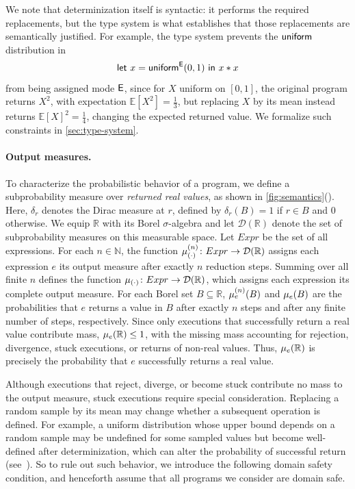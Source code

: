 We note that determinization itself is syntactic: it performs the required replacements, but the type system is what establishes that those replacements are semantically justified. For example, the type system prevents the $\mathsf{uniform}$ distribution in
\[
  \kw{let}\ x=\kw{uniform}^{\E}(0,1)\ \kw{in}\ x*x
\]
from being assigned mode $\mathsf{E}$, since for $X$ uniform on $[0,1]$, the original program returns $X^2$, with
expectation $\mathbb{E}[X^2]=\frac{1}{3}$, but replacing $X$ by its mean
instead returns $\mathbb{E}[X]^2=\frac{1}{4}$, changing the expected
returned value. We formalize such constraints in \cref{sec:type-system}.

\paragraph{Output measures.}
To characterize the probabilistic behavior of a program,
we define a subprobability measure over \emph{returned real values}, as shown in \cref{fig:semantics}(). Here, $\delta_r$ denotes the Dirac measure at $r$, defined by $\delta_r(B)=1$ if $r\in B$ and $0$ otherwise. We equip $\mathbb R$ with its Borel $\sigma$-algebra and let
$\mathcal D(\mathbb R)$ denote the set of subprobability measures on this measurable space. Let $Expr$ be the set of all expressions. For each $n\in\mathbb N$, the function
$\mu_{(\cdot)}^{(n)}\colon Expr\to\mathcal D(\mathbb R)$
assigns each expression $e$ its output measure after exactly $n$
reduction steps. 
Summing over all finite $n$ defines the function
$\mu_{(\cdot)}\colon Expr\to\mathcal D(\mathbb R)$,
which assigns each expression its complete output measure.
For each Borel set $B\subseteq\mathbb R$, $\mu_{e}^{(n)}(B)$ and $\mu_{e}(B)$
are the probabilities that $e$ returns a value in $B$ after exactly
$n$ steps and after any finite number of steps, respectively.
Since only executions that successfully return a real value
contribute mass, $\mu_{e}(\mathbb{R})\leq 1$, with the missing mass
accounting for rejection, divergence, stuck executions, or returns of non-real values.
Thus, $\mu_{e}(\mathbb{R})$ is precisely the probability that
$e$ successfully returns a real value.

Although executions that reject, diverge, or become stuck contribute no mass to the output measure, stuck executions require special consideration. Replacing a random sample by its mean may change whether a subsequent operation is defined. For example, a uniform distribution whose upper bound depends on a random sample may be undefined for some sampled values but become well-defined after determinization, which can alter the probability of successful return (see~). So to rule out such behavior, we introduce the following
domain safety condition, and henceforth assume that all programs we consider are domain safe.

